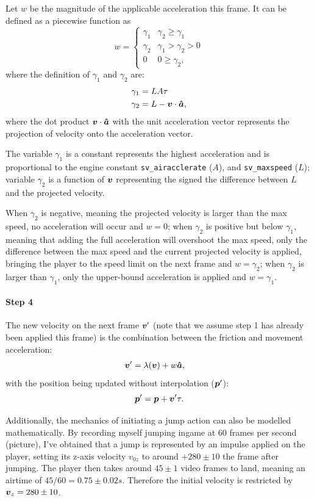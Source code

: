 Let $w$ be the magnitude of the applicable acceleration this frame. It can be defined as a piecewise function as
\[
w = \begin{cases}
    \gamma_1 & \gamma_2 \ge \gamma_1\\
    \gamma_2 & \gamma_1 > \gamma_2 > 0\\
    0 & 0 \ge \gamma_2,
\end{cases}
\]
where the definition of $\gamma_1$ and $\gamma_2$ are:
\begin{align*}
    \gamma_1 &= LA\tau\\
    \gamma_2 &= L - \boldsymbol{v} \cdot \boldsymbol{\hat{\boldsymbol{a}}},
\end{align*}
where the dot product $\boldsymbol{v} \cdot \boldsymbol{\hat{\boldsymbol{a}}}$ with the unit acceleration vector represents the projection of velocity onto the acceleration vector.

The variable $\gamma_1$ is a constant represents the highest acceleration and is proportional to the engine constant \verb|sv_airacclerate| ($A$), and \verb|sv_maxspeed| ($L$); variable $\gamma_2$ is a function of $\boldsymbol{v}$ representing the signed the difference between $L$ and the projected velocity.

When $\gamma_2$ is negative, meaning the projected velocity is larger than the max speed, no acceleration will occur and $w=0$; when $\gamma_2$ is positive but below $\gamma_1$, meaning that adding the full acceleration will overshoot the max speed, only the difference between the max speed and the current projected velocity is applied, bringing the player to the speed limit on the next frame and $w=\gamma_2$; when $\gamma_2$ is larger than $\gamma_1$, only the upper-bound acceleration is applied and $w=\gamma_1$.



\paragraph{Step 4} The new velocity on the next frame $\boldsymbol{v}'$ (note that we assume step 1 has already been applied this frame) is the combination between the friction and movement acceleration:
\begin{align}
    \boldsymbol{v}' &= \lambda(\boldsymbol{v}) + w \boldsymbol{\hat{\boldsymbol{a}}}\label{eq:dis_vel},
\end{align}
with the position being updated without interpolation ($\boldsymbol{p}'$):
\[
\boldsymbol{p}' = \boldsymbol{p} + \boldsymbol{v}' \tau.
\]

Additionally, the mechanics of initiating a jump action can also be modelled mathematically. By recording myself jumping ingame at 60 frames per second (picture), I've obtained that a jump is represented by an impulse applied on the player, setting its z-axis velocity $v_{0z}$ to around $+280\pm10$ the frame after jumping. The player then takes around $45 \pm1$ video frames to land, meaning an airtime of $45 / 60 =0.75\pm 0.02\si{s}$. Therefore the initial velocity is restricted by $\boldsymbol{v}_z = 280\pm10$.

